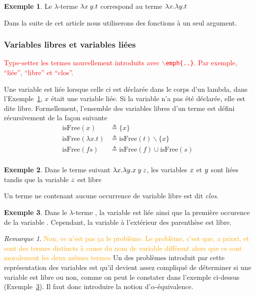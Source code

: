 \documentclass {article}
\theoremstyle{definition}
\newtheorem{example}{Exemple}
\theoremstyle{remark}
\newtheorem{remark}{Remarque}
\newcommand{\todo}[1]{\textcolor{red}{#1}}
\newcommand{\attention}[1]{\textcolor{orange}{#1}}
\begin{document}
\begin{example}
  \label{example:id}
  Le \(\lambda\)-terme $\lambda x\: y. t$ correspond au terme $\lambda x. \lambda y. t$  
\end{example} 

Dans la suite de cet article nous utiliserons des fonctions à un seul
argument.

\subsubsection{Variables libres et variables liées}

\newcommand{\IsFree}{\mathrm{isFree}}


\todo{Type-setter les termes nouvellement introduits avec
  \texttt{$\backslash$emph\{..\}}. Par exemple, ``liée'', ``libre'' et
  ``clos''.}

Une variable est liée lorsque celle ci est déclarée dans le corps d'un
lambda, dans l'Exemple~\ref{example:id}, $x$ était une variable liée.
Si la variable n'a pas été déclarée, elle est dite
libre. Formellement, l'ensemble des variables libres d'un terme est
défini récursivement de la façon suivante
%
\begin{align*}
  \IsFree(x) &\triangleq \{x\} \\
  \IsFree(\lambda x. t) &\triangleq \IsFree(t) \backslash \{x\} \\
  \IsFree(f s) &\triangleq \IsFree(f) \cup \IsFree(s) \\
\end{align*}


\begin{example}
  Dans le terme suivant \(\lambda x. \lambda y. x\:y\:z\), 
  les variables $x$ et $y$ sont liées tandis que la variable $z$ est libre 
\end{example}


Un terme ne contenant aucune occurrence de variable libre est dit \emph{clos}.

\begin{example}  
  \label{example:ouvert-clos}  
  Dans le $\lambda$-terme , la
  variable  est liée ainsi que la première occurence de la
  variable . Cependant, la variable  à l'extérieur des
  parenthèse est libre.
\end{example}

\begin{remark}
\label{problemelibreliee}
\attention{Non, ce n'est pas ça le problème. Le problème, c'est que, a
  priori, \Lam{\Var{x}}{\Var{x}} et \Lam{\Var{y}}{\Var{y}} sont des
  termes distincts à cause du nom de variable différent alors que ce
  sont moralement les deux mêmes termes}
Un des problèmes introduit par cette représentation des variables est qu'il devient assez compliqué de déterminer si une variable est libre ou non, comme on peut le constater dans l'exemple ci-dessus (Exemple~\ref{example:ouvert-clos}). Il faut donc introduire la notion 
d'$\alpha$-équivalence.
\end{remark}
\end{document}
